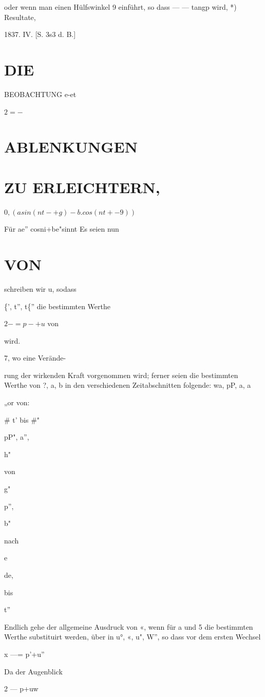 \documentclass[12pt,a4paper]{article}
\begin{document}
oder wenn man einen Hülfswinkel 9 einführt, so dass — — tangp wird, *) Resultate,

1837. IV. [S. 3s3 d. B.]

\section*{DIE}
BEOBACHTUNG e-et

$2 = -$

\section*{ABLENKUNGEN}
\section*{ZU ERLEICHTERN,}
$0, (asin (nt-+g)-b.cos(nt+-9))$

Für ae” cosni+be"sinnt Es seien nun

\section*{VON}
schreiben wir u, sodass

\{’, t”, t\{” die bestimmten Werthe

$2 -=p-+u$ von

wird.

7, wo eine Verände-

rung der wirkenden Kraft vorgenommen wird; ferner seien die bestimmten Werthe von ?, a, b in den verschiedenen Zeitabschnitten folgende: wa, pP, a, a

„or von:

\# t' bis \#"

pP", a”,

h"

von

g"

p”,

b"

nach

e

de,

bis

t”

Endlich gehe der allgemeine Ausdruck von «, wenn für a und 5 die bestimmten Werthe substituirt werden, über in u°, «, u", W”, so dass vor dem ersten Wechsel

x —= p’+u”

Da der Augenblick

2 — p+uw
\end{document}
